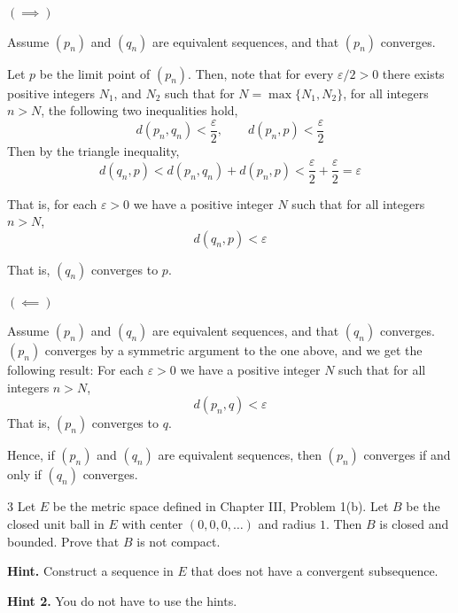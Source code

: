 \documentclass[12pt]{article}
\begin{document}
\begin{solution}
    \bbni

    $(\implies)$ 

    Assume $(p_n)$ and $(q_n)$ are equivalent sequences, and that $(p_n)$ converges. 

    Let $p$ be the limit point of $(p_n)$. Then, note that for every $\varepsilon/2 >0$ there exists positive integers $N_1$, and $N_2$ such that for $N = \max\{N_1, N_2\}$, for all integers $n > N$, the following two inequalities hold, 
    \[d(p_n, q_n) < \frac{\varepsilon}{2} , \qquad d(p_n, p) < \frac{\varepsilon}{2}\]
    Then by the triangle inequality, 
    \[d(q_n, p) < d(p_n, q_n) + d(p_n, p)< \frac{\varepsilon}{2} + \frac{\varepsilon}{2} = \varepsilon\]

    That is, for each $\varepsilon >0$ we have a positive integer $N$ such that for all integers $n > N$, 
    \[d(q_n, p) < \varepsilon\]

    That is, $(q_n)$ converges to $p$. 

     $(\impliedby)$ 

    Assume $(p_n)$ and $(q_n)$ are equivalent sequences, and that $(q_n)$ converges. $(p_n)$ converges by a symmetric argument to the one above, and we get the following result: 
    For each $\varepsilon >0$ we have a positive integer $N$ such that for all integers $n > N$, 
    \[d(p_n, q) < \varepsilon\]
    That is, $(p_n)$ converges to $q$. 

    Hence, if $(p_n)$ and $(q_n)$ are equivalent sequences, then $(p_n)$ converges if and only if $(q_n)$ converges.
\end{solution}

\newpage

\begin{problem}{3}
Let $E$ be the metric space defined in Chapter III, Problem 1(b). Let $B$ be the closed unit ball
in $E$ with center $(0,0,0,\dots)$ and radius $1$. Then $B$ is closed and bounded. Prove that $B$ is not compact.

\textbf{Hint.} Construct a sequence in $E$ that does not have a convergent subsequence.

\textbf{Hint 2.} You do not have to use the hints.
\end{problem}
\end{document}
